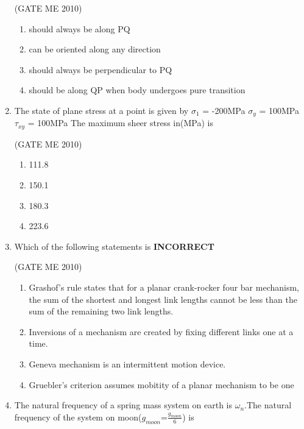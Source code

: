 \documentclass[journal,12pt,onecolumn]{IEEEtran}
\theoremstyle{remark}
\begin{document}
\begin{enumerate}
 \hfill{(GATE ME 2010)}\\
\begin{enumerate}
\item  should always be along PQ
\item  can be oriented along any direction 
\item  should always be perpendicular to PQ
\item should be along QP when body undergoes pure transition

\end{enumerate}
 

\item The state of plane stress at a point is given by $\sigma_{1}$ = -200MPa  $\sigma_{y}$ = 100MPa $\tau_{xy}$ = 100MPa The maximum sheer stress in(MPa) is 

 \hfill{(GATE ME 2010)}\\
\begin{multicols}{4}
\begin{enumerate}
\item 111.8
\item 150.1
\item 180.3
\item 223.6
\end{enumerate}
\end{multicols}


\item Which of the following statements is \textbf{INCORRECT}

 \hfill{(GATE ME 2010)}\\
 
\begin{enumerate}
\item Grashof's rule states that for a planar crank-rocker four bar mechanism, the sum of the shortest and longest link lengths cannot be less than the sum of the remaining  two link lengths.
\item Inversions of a mechanism are created by fixing different links one at a time.
\item Geneva mechanism is an intermittent motion device.
\item Gruebler's criterion assumes mobitity of a planar mechanism to be one
\end{enumerate}
 


\item The natural frequency of a spring mass system on earth is $\omega_{n}$.The natural frequency of the system on moon($g_{moon}$=$\frac{g_{moon}}{6}$) is


\end{enumerate}
\end{document}
